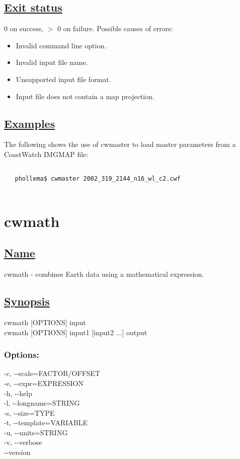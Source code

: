 \subsection*{\underline{Exit status}}


  0 on success, $>$ 0 on failure. Possible causes of errors:
\begin{itemize}
\item  Invalid command line option. 
\item  Invalid input file name. 
\item  Unsupported input file format. 
\item  Input file does not contain a map projection. 

\end{itemize}
\subsection*{\underline{Examples}}


  The following shows the use of cwmaster to load master parameters from a CoastWatch IMGMAP file:
\begin{verbatim}

   phollema$ cwmaster 2002_319_2144_n16_wl_c2.cwf
 
\end{verbatim}

\newpage
\section{cwmath} \hypertarget{cwmath}{}
\subsection*{\underline{Name}}


   cwmath - combines Earth data using a mathematical expression.  
\subsection*{\underline{Synopsis}}


  cwmath [OPTIONS] input \\ 
 cwmath [OPTIONS] input1 [input2 ...] output 
\subsubsection*{Options:}


  -c, -{-}scale=FACTOR/OFFSET \\ 
 -e, -{-}expr=EXPRESSION \\ 
 -h, -{-}help \\ 
 -l, -{-}longname=STRING \\ 
 -s, -{-}size=TYPE \\ 
 -t, -{-}template=VARIABLE \\ 
 -u, -{-}units=STRING \\ 
 -v, -{-}verbose \\ 
 -{-}version \\ 

